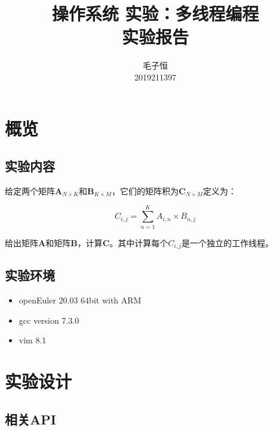 \documentclass[lang=cn,11pt,a4paper,cite=authornum]{paper}
\title{操作系统 实验：多线程编程 \\ 实验报告}
\author{毛子恒 \\ 2019211397}
\institute{北京邮电大学\ 计算机学院}
\date{\zhtoday}
\begin{document}
\maketitle

\section{概览}

\subsection{实验内容}

给定两个矩阵$\mathbf{A}_{N\times K}$和$\mathbf{B}_{K\times M}$，它们的矩阵积为$\mathbf{C}_{N\times M}$定义为：

$$
C_{i,j}=\sum_{n=1}^{K}A_{i,n}\times B_{n,j}
$$

给出矩阵$\mathbf A$和矩阵$\mathbf B$，计算$\mathbf C$。其中计算每个$C_{i,j}$是一个独立的工作线程。

\subsection{实验环境}

\begin{itemize}
    \item openEuler 20.03 64bit with ARM
    \item gcc version 7.3.0
    \item vim 8.1
\end{itemize}

\section{实验设计}

\subsection{相关API}
\end{document}
